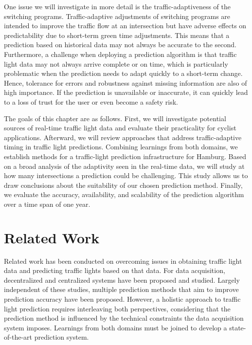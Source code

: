 One issue we will investigate in more detail is the traffic-adaptiveness of the switching programs. Traffic-adaptive adjustments of switching programs are intended to improve the traffic flow at an intersection but have adverse effects on predictability due to short-term green time adjustments. This means that a prediction based on historical data may not always be accurate to the second. Furthermore, a challenge when deploying a prediction algorithm is that traffic light data may not always arrive complete or on time, which is particularly problematic when the prediction needs to adapt quickly to a short-term change. Hence, tolerance for errors and robustness against missing information are also of high importance. If the prediction is unavailable or inaccurate, it can quickly lead to a loss of trust for the user or even become a safety risk.


The goals of this chapter are as follows. First, we will investigate potential sources of real-time traffic light data and evaluate their practicality for cyclist applications. Afterward, we will review approaches that address traffic-adaptive timing in traffic light predictions. Combining learnings from both domains, we establish methods for a traffic-light prediction infrastructure for Hamburg. Based on a broad analysis of the adaptivity seen in the real-time data, we will study at how many intersections a prediction could be challenging. This study allows us to draw conclusions about the suitability of our chosen prediction method. Finally, we evaluate the accuracy, availability, and scalability of the prediction algorithm over a time span of one year.

\section{Related Work}

Related work has been conducted on overcoming issues in obtaining traffic light data and predicting traffic lights based on that data. For data acquisition, decentralized and centralized systems have been proposed and studied. Largely independent of these studies, multiple prediction methods that aim to improve prediction accuracy have been proposed. However, a holistic approach to traffic light prediction requires interleaving both perspectives, considering that the prediction method is influenced by the technical constraints the data acquisition system imposes. Learnings from both domains must be joined to develop a state-of-the-art prediction system.

